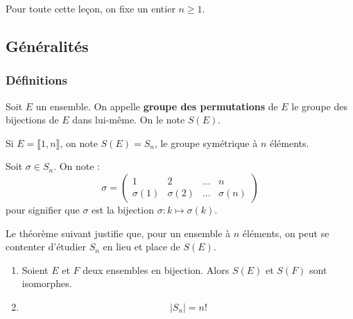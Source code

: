 




  Pour toute cette leçon, on fixe un entier $n \geq 1$.

  \subsection{Généralités}

  \subsubsection{Définitions}


  \begin{definition}
    Soit $E$ un ensemble. On appelle \textbf{groupe des permutations} de $E$ le groupe des bijections de $E$ dans lui-même. On le note $S(E)$.
  \end{definition}

  \begin{notation}
    Si $E = \llbracket 1, n \rrbracket$, on note $S(E) = S_n$, le groupe symétrique à $n$ éléments.
  \end{notation}

  \begin{notation}
    Soit $\sigma \in S_n$. On note :
    \[
      \sigma =
      \begin{pmatrix}
        1 & 2 & \dots & n \\
        \sigma(1) & \sigma(2) & \dots & \sigma(n)
      \end{pmatrix}
    \]
    pour signifier que $\sigma$ est la bijection $\sigma : k \mapsto \sigma(k)$.
  \end{notation}

  Le théorème suivant justifie que, pour un ensemble à $n$ éléments, on peut se contenter d'étudier $S_n$ en lieu et place de $S(E)$.

  \begin{theorem}
    \begin{enumerate}[label={\bfseries(\roman*)}]
      \item Soient $E$ et $F$ deux ensembles en bijection. Alors $S(E)$ et $S(F)$ sont isomorphes.
      \item \[ |S_n| = n! \]
    \end{enumerate}
  \end{theorem}


